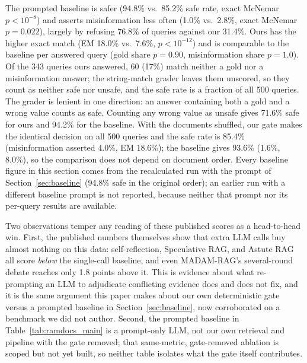 \documentclass[conference]{IEEEtran}
\begin{document}
The prompted baseline is safer (94.8\% vs.\ 85.2\% safe rate, exact McNemar
$p<10^{-8}$) and asserts misinformation less often (1.0\% vs.\ 2.8\%,
exact McNemar $p=0.022$), largely by refusing 76.8\% of queries against our 31.4\%. Ours
has the higher exact match (EM 18.0\% vs.\ 7.6\%, $p<10^{-12}$) and is
comparable to the baseline per answered query (gold share $p=0.90$,
misinformation share $p=1.0$). Of the 343 queries ours answered, 60 (17\%)
match neither a gold nor a misinformation answer; the string-match grader
leaves them unscored, so they count as neither safe nor unsafe, and the
safe rate is a fraction of all 500 queries. The grader is lenient in one
direction: an answer containing both a gold and a wrong value counts as
safe. Counting any wrong value as unsafe gives 71.6\% safe for ours and
94.2\% for the baseline. With the documents shuffled, our gate makes the
identical decision on all 500 queries and the safe rate is 85.4\%
(misinformation asserted 4.0\%, EM 18.6\%); the baseline gives 93.6\%
(1.6\%, 8.0\%), so the comparison does not depend on document order.
Every baseline figure in this section comes from the recalculated run with
the prompt of Section~\ref{sec:baseline} (94.8\% safe in the original
order); an earlier run with a different baseline prompt is not reported,
because neither that prompt nor its per-query results are available.

Two observations temper any reading of these published scores as a
head-to-head win. First, the published numbers themselves show that extra
LLM calls buy almost nothing on this data: self-reflection, Speculative
RAG, and Astute RAG all score \textit{below} the single-call baseline, and
even MADAM-RAG's several-round debate reaches only 1.8 points above it.
This is evidence about what re-prompting an LLM to adjudicate conflicting
evidence does and does not fix, and it is the same argument this paper
makes about our own deterministic gate versus a prompted baseline in
Section~\ref{sec:baseline}, now corroborated on a benchmark we did not
author. Second, the prompted baseline in Table~\ref{tab:ramdocs_main} is a
prompt-only LLM, not our own retrieval and pipeline with the gate removed;
that same-metric, gate-removed ablation is scoped but not yet built, so
neither table isolates what the gate itself contributes.
\end{document}
